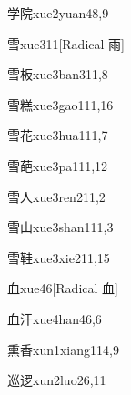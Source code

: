 \begin{entry}{学院}{xue2yuan4}{8,9}
\end{entry}

\begin{entry}{雪}{xue3}{11}[Radical 雨]
\end{entry}

\begin{entry}{雪板}{xue3ban3}{11,8}
\end{entry}

\begin{entry}{雪糕}{xue3gao1}{11,16}
\end{entry}

\begin{entry}{雪花}{xue3hua1}{11,7}
\end{entry}

\begin{entry}{雪葩}{xue3pa1}{11,12}
\end{entry}

\begin{entry}{雪人}{xue3ren2}{11,2}
\end{entry}

\begin{entry}{雪山}{xue3shan1}{11,3}
\end{entry}

\begin{entry}{雪鞋}{xue3xie2}{11,15}
\end{entry}

\begin{entry}{血}{xue4}{6}[Radical 血]
\end{entry}

\begin{entry}{血汗}{xue4han4}{6,6}
\end{entry}

\begin{entry}{熏香}{xun1xiang1}{14,9}
\end{entry}

\begin{entry}{巡逻}{xun2luo2}{6,11}
\end{entry}


